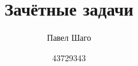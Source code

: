 \documentclass{report}
\title{\Huge{Зачётные задачи}}
\author{\huge{Павел Шаго}}
\date{43729343}
\begin{document}
\maketitle{}


\begin{multline}
\end{multline}

\begin{multline}
\end{multline}

\begin{multline}
\end{multline}

\begin{multline}
\end{multline}

\begin{multline}
\end{multline}

\begin{multline}
\end{multline}

\begin{multline}
\end{multline}

\begin{multline}
\end{multline}

\begin{multline}
\end{multline}

\begin{multline}
\end{multline}

\begin{multline}
\end{multline}

\begin{multline}
\end{multline}

\begin{multline}
\end{multline}
\end{document}
